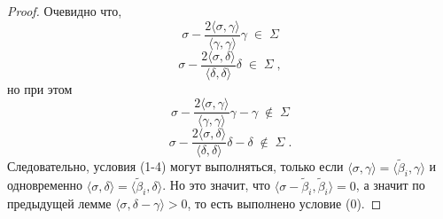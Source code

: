 \documentclass[10pt]{article}
\theoremstyle{break}
\theoremstyle{remark}
\begin{document}
\begin{proof}
Очевидно что,
$$ \sigma - \frac{2 \langle \sigma,\gamma\rangle}{\langle \gamma , \gamma \rangle}\gamma \;\in\; \Sigma $$
$$ \sigma - \frac{2 \langle \sigma,\delta\rangle}{\langle \delta , \delta \rangle}\delta \;\in\; \Sigma \; , $$
но при этом
$$ \sigma - \frac{2 \langle \sigma,\gamma\rangle}{\langle \gamma , \gamma \rangle}\gamma-\gamma \;\notin\; \Sigma $$
$$ \sigma - \frac{2 \langle \sigma,\delta\rangle}{\langle \delta , \delta \rangle}\delta-\delta \;\notin\; \Sigma \; . $$
Следовательно, условия (1-4) могут выполняться, только если $\langle\sigma,\gamma\rangle=\langle\widetilde\beta_i,\gamma\rangle$
и одновременно $\langle\sigma,\delta\rangle=\langle\widetilde\beta_i,\delta\rangle$. Но это значит, что $\langle\sigma-\widetilde\beta_i,\widetilde\beta_i\rangle=0$,
а значит по предыдущей лемме $\langle\sigma,\delta-\gamma\rangle > 0$, то есть выполнено условие (0).
\end{proof}
\end{document}
